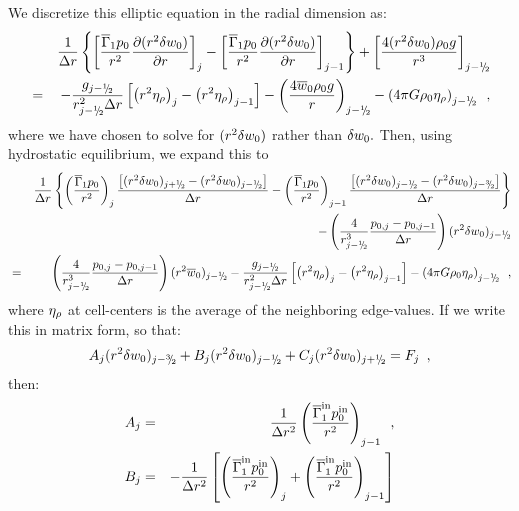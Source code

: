 \begin{enumerate}
\begin{description}
\noindent We discretize this elliptic equation in the radial dimension as:
\begin{eqnarray}
&& \frac{1}{\Delta r} \left\{
\left[ \frac{\gammabar p_0}{r^2} \frac{\partial (r^2 \dw)}{\partial r} \right]_{j} -
\left[ \frac{\gammabar p_0}{r^2} \frac{\partial (r^2 \dw)}{\partial r} \right]_{j-1} \right\}
+ \left[ \frac{4 (r^2 \dw) \rho_0 g}{r^3} \right]_{j-\myhalf} \nonumber\\
&=& 
- \frac{g_{j-\myhalf}}{r_{j-\myhalf}^2 \Delta r} 
\left[ \left( r^2 \etarho \right)_{j} - \left( r^2 \etarho  \right)_{j-1} \right] 
   - \left( \frac{4 \ow \rho_0 g}{r} \right)_{j-\myhalf}
   - \left(  4 \pi G \rhozero \etarho   \right)_{j-\myhalf} \enskip , \nonumber
\end{eqnarray}
where we have chosen to solve for $(r^2 \delta w_0)$ rather than $\delta w_0.$
Then, using hydrostatic equilibrium, we expand this to 
\begin{eqnarray}
&& \frac{1}{\Delta r} \left\{
 \left( \frac{\gammabar p_0}{r^2}\right)_{j  } \frac{\left[ (r^2 \dw)_{j+\myhalf} - (r^2 \dw)_{j-\myhalf} \right]}{\Delta r}
-\left( \frac{\gammabar p_0}{r^2}\right)_{j-1} \frac{\left[ (r^2 \dw)_{j-\myhalf} - (r^2 \dw)_{j-\thalf}\right]}{\Delta r} \right\} \nonumber \\
&&  - \left( \frac{4}{r_{j-\myhalf} ^3} \frac{p_{0,j} - p_{0,j-1}}{\dr} \right) (r^2 \dw)_{j-\myhalf}  \nonumber \\
&=&   \left( \frac{4}{r_{j-\myhalf} ^3} \frac{p_{0,j} - p_{0,j-1}}{\dr} \right) (r^2 \ow)_{j-\myhalf}
 - \frac{g_{j-\myhalf}}{r_{j-\myhalf}^2 \Delta r} 
  \left[ \left( r^2 \etarho \right)_{j} - \left( r^2 \etarho  \right)_{j-1} \right] 
- \left(  4 \pi G \rhozero \etarho   \right)_{j-\myhalf} \enskip, \nonumber \\
\end{eqnarray}
where $\eta_{\rho}$ at cell-centers is the average of the neighboring edge-values.  
If we write this in matrix form, so that:
\begin{equation}
A_j (r^2 \dw)_{j-\thalf} + B_j (r^2 \dw)_{j-\myhalf} + C_j (r^2 \dw)_{j+\myhalf} = F_j\enskip,
\end{equation}
then:
\begin{eqnarray}
A_j &=& \frac{1}{\Delta r^2} \left( \frac{\gammabar^{\inp} p_0^{\inp}}{r^2}\right)_{j-1}  \enskip, \nonumber  \\
B_j &=& -\frac{1}{\Delta r^2} \left[ \left( \frac{\gammabar^{\inp} p_0^{\inp}}{r^2}\right)_{j  }  
               +\left( \frac{\gammabar^{\inp} p_0^{\inp}}{r^2}\right)_{j-1} \right] 

\end{eqnarray}
\end{description}
\end{enumerate}
